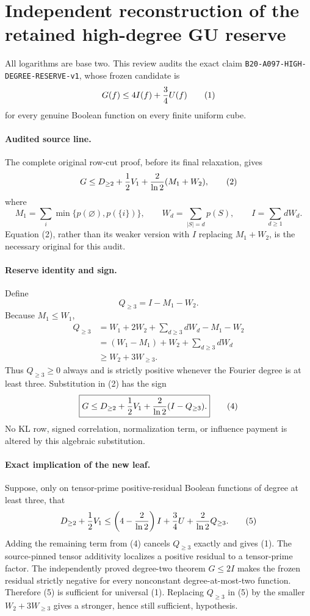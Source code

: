 \section*{Independent reconstruction of the retained high-degree GU reserve}

All logarithms are base two.  This review audits the exact claim
\texttt{B20-A097-HIGH-DEGREE-RESERVE-v1}, whose frozen candidate is
\[
 G(f)\le4I(f)+{3\over4}U(f)                           \tag{1}
\]
for every genuine Boolean function on every finite uniform cube.

\paragraph{Audited source line.}
The complete original row-cut proof, before its final relaxation, gives
\[
 G\le D_{\ge2}+{1\over2}V_1+{2\over\ln2}(M_1+W_2),    \tag{2}
\]
where
\[
 M_1=\sum_i\min\{p(\varnothing),p(\{i\})\},\qquad
 W_d=\sum_{|S|=d}p(S),\qquad I=\sum_{d\ge1}dW_d.
\]
Equation (2), rather than its weaker version with $I$ replacing
$M_1+W_2$, is the necessary original for this audit.

\paragraph{Reserve identity and sign.}
Define
\[
 Q_{\ge3}=I-M_1-W_2.
\]
Because $M_1\le W_1$,
\[
 \begin{aligned}
 Q_{\ge3}
 &=W_1+2W_2+\sum_{d\ge3}dW_d-M_1-W_2\\
 &=(W_1-M_1)+W_2+\sum_{d\ge3}dW_d\\
 &\ge W_2+3W_{\ge3}.                                  \tag{3}
 \end{aligned}
\]
Thus $Q_{\ge3}\ge0$ always and is strictly positive whenever the
Fourier degree is at least three.  Substitution in (2) has the sign
\[
 \boxed{
 G\le D_{\ge2}+{1\over2}V_1
       +{2\over\ln2}(I-Q_{\ge3}).}                    \tag{4}
\]
No KL row, signed correlation, normalization term, or influence payment
is altered by this algebraic substitution.

\paragraph{Exact implication of the new leaf.}
Suppose, only on tensor-prime positive-residual Boolean functions of
degree at least three, that
\[
 D_{\ge2}+{1\over2}V_1
 \le\left(4-{2\over\ln2}\right)I+{3\over4}U
       +{2\over\ln2}Q_{\ge3}.                         \tag{5}
\]
Adding the remaining term from (4) cancels $Q_{\ge3}$ exactly and gives
(1).  The source-pinned tensor additivity localizes a positive residual
to a tensor-prime factor.  The independently proved degree-two theorem
$G\le2I$ makes the frozen residual strictly negative for every
nonconstant degree-at-most-two function.  Therefore (5) is sufficient
for universal (1).  Replacing $Q_{\ge3}$ in (5) by the smaller
$W_2+3W_{\ge3}$ gives a stronger, hence still sufficient, hypothesis.

